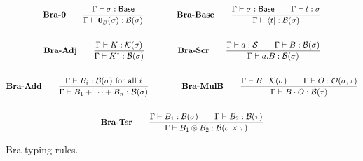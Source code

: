 \documentclass{article}
\begin{document}
\begin{figure}[h]
    \begin{gather*}
        \textbf{Bra-0} \qquad
        \frac{\Gamma \vdash \sigma : \mathsf{Base}}{\Gamma \vdash \mathbf{0}_\mathcal{B}(\sigma) : \mathcal{B}(\sigma)} 
        \qquad \qquad
        \textbf{Bra-Base} \qquad
        \frac{\Gamma \vdash \sigma : \mathsf{Base} \qquad \Gamma\vdash t : \sigma}{\Gamma \vdash \bra{t} : \mathcal{B}(\sigma)} \\
        \\
        \textbf{Bra-Adj} \qquad
        \frac{\Gamma \vdash K : \mathcal{K}(\sigma)}{\Gamma \vdash K^\dagger : \mathcal{B}(\sigma)} 
        \qquad \qquad
        \textbf{Bra-Scr} \qquad
        \frac{\Gamma \vdash a : \mathcal{S} \qquad \Gamma \vdash B : \mathcal{B}(\sigma)}{\Gamma \vdash a.B : \mathcal{B}(\sigma)} \\
        \\
        \textbf{Bra-Add} \qquad
        \frac{\Gamma \vdash B_i : \mathcal{B}(\sigma) \text{ for all $i$}}{\Gamma \vdash B_1 + \cdots + B_n : \mathcal{B}(\sigma)}
        \qquad \qquad
        \textbf{Bra-MulB} \qquad
        \frac{\Gamma \vdash B : \mathcal{K}(\sigma) \qquad \Gamma \vdash O : \mathcal{O}(\sigma, \tau)}{\Gamma \vdash B \cdot O : \mathcal{B}(\tau)} \\
        \\
        \textbf{Bra-Tsr} \qquad
        \frac{\Gamma \vdash B_1 : \mathcal{B}(\sigma) \qquad \Gamma \vdash B_2 : \mathcal{B}(\tau)} {\Gamma \vdash B_1 \otimes B_2 : \mathcal{B}(\sigma \times \tau)}
    \end{gather*}
    \caption{Bra typing rules.}
\end{figure}
\end{document}
